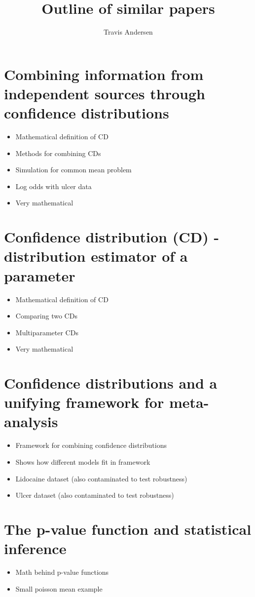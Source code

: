 \documentclass{article}
\title{Outline of similar papers}
\author{Travis Andersen}
\begin{document}
\maketitle

\section{Combining information from independent sources through confidence distributions}
\begin{itemize}
  \item Mathematical definition of CD
  \item Methods for combining CDs
  \item Simulation for common mean problem
  \item Log odds with ulcer data
  \item Very mathematical
\end{itemize}

\section{Confidence distribution (CD) - distribution estimator of a parameter}
\begin{itemize}
  \item Mathematical definition of CD
  \item Comparing two CDs
  \item Multiparameter CDs
  \item Very mathematical
\end{itemize}

\section{Confidence distributions and a unifying framework for meta-analysis}
\begin{itemize}
  \item Framework for combining confidence distributions
  \item Shows how different models fit in framework
  \item Lidocaine dataset (also contaminated to test robustness)
  \item Ulcer dataset (also contaminated to test robustness)
\end{itemize}

\section{The p-value function and statistical inference}
\begin{itemize}
  \item Math behind p-value functions
  \item Small poisson mean example
\end{itemize}
\end{document}

